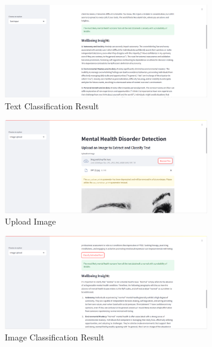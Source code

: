 \begin{figure}[h!]  
    \centering
    \includegraphics[width=0.8\textwidth]{App Images/03 Interface.png}  
    \caption{Text Classification Result}
    \label{03i}  %
\end{figure}



\begin{figure}[h!]  
    \centering
    \includegraphics[width=0.8\textwidth]{App Images/04 Interface.png}  
    \caption{Upload Image}
    \label{04i}  %
\end{figure}

\pagebreak

\begin{figure}[h!]  
    \centering
    \includegraphics[width=0.8\textwidth]{App Images/05 Interface.png}  
    \caption{Image Classification Result}
    \label{05i}  %
\end{figure}


